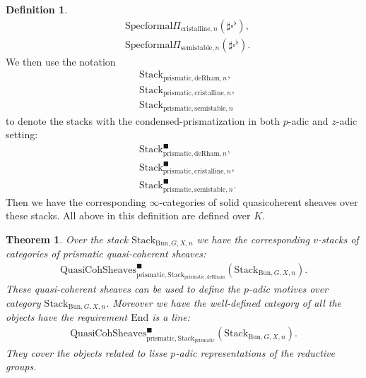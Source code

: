 \documentclass[12pt]{article}
\newtheorem{theorem}{Theorem}
\theoremstyle{definition}
\newtheorem{definition}{Definition}
\begin{document}
\begin{definition}
\begin{align}
&\mathrm{Specformal}\Pi_{\mathrm{cristalline},n}(\sharp\square^\flat),\\
&\mathrm{Specformal}\Pi_{\mathrm{semistable},n}(\sharp\square^\flat).
\end{align}
We then use the notation 
\begin{align}
&\mathrm{Stack}_{\mathrm{prismatic},\mathrm{deRham},n},\\
&\mathrm{Stack}_{\mathrm{prismatic},\mathrm{cristalline},n},\\
&\mathrm{Stack}_{\mathrm{prismatic},\mathrm{semistable},n}
\end{align}
to denote the stacks with the condensed-prismatization in both $p$-adic and $z$-adic setting:
\begin{align}
&\mathrm{Stack}^\blacksquare_{\mathrm{prismatic},\mathrm{deRham},n},\\&\mathrm{Stack}^\blacksquare_{\mathrm{prismatic},\mathrm{cristalline},n},\\
&\mathrm{Stack}^\blacksquare_{\mathrm{prismatic},\mathrm{semistable},n}.
\end{align}
Then we have the corresponding $\infty$-categories of solid quasicoherent sheaves over these stacks. All above in this definition are defined over $K$. 
\end{definition}





\begin{theorem}
Over the stack $\mathrm{Stack}_{\mathrm{Bun},G,X,n}$ we have the corresponding $v$-stacks of categories of prismatic quasi-coherent sheaves:
\begin{align}
\mathrm{QuasiCohSheaves}^\blacksquare_{\mathrm{prismatic},\mathrm{Stack}_{\mathrm{prismatic},\mathrm{deRham}}}(\mathrm{Stack}_{\mathrm{Bun},G,X,n}).
\end{align}
These quasi-coherent sheaves can be used to define the $p$-adic motives over category $\mathrm{Stack}_{\mathrm{Bun},G,X,n}$. Moreover we have the well-defined category of all the objects have the requirement $\mathrm{End}$ is a line:
\begin{align}
\mathrm{QuasiCohSheaves}^\blacksquare_{\mathrm{prismatic},\mathrm{Stack}_{\mathrm{prismatic}}}(\mathrm{Stack}_{\mathrm{Bun},G,X,n}).
\end{align}
They cover the objects related to lisse $p$-adic representations of the reductive groups.
\end{theorem}
\end{document}
